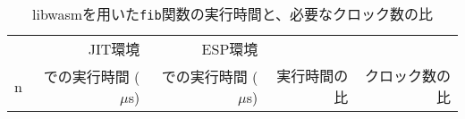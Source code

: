 \begin{table}[htbp]
  \caption{libwasmを用いた{\tt fib}関数の実行時間と、必要なクロック数の比}
  \label{tab:fib_time}
  \begin{center}
    \begin{tabular}{rrrrr}
      \hline
      & JIT環境 & ESP環境 & & \\
      n & での実行時間 ($\mu$s) & での実行時間 ($\mu$s) & 実行時間の比 & クロック数の比 \\ \hline \hline

\end{tabular}
\end{center}
\end{table}
